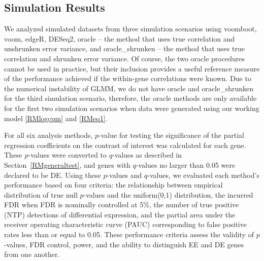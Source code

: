\subsection{Simulation Results}
We analyzed simulated datasets from  three simulation scenarios using  voomboot, voom, edgeR, DESeq2, oracle -- the method that uses true correlation   and unshrunken error variance, and oracle\_shrunken -- the method that uses true correlation  and shrunken error variance. Of course, the two oracle procedures cannot be used in practice, but their inclusion provides a useful reference measure of the performance achieved if the within-gene correlations were known. Due to the numerical instability of GLMM, we do not have oracle and oracle\_shrunken  for the third simulation scenario, therefore, the oracle methods are only available for the first two simulation scenarios when data were generated using our  working model  \eqref{RMlogcpm} and \eqref{RMeq1}.

For all six analysis methods, $p$-value for testing the significance of the partial regression coefficients on the contrast of interest was calculated for each gene. These $p$-values were converted to $q$-values as described in Section~\ref{RMgeneraltest}, and genes with $q$-values no larger than 0.05 were declared to be DE. Using these $p$-values and $q$-values, we evaluated each method's performance based on four criteria: the relationship between empirical distribution of true null $p$-values and the uniform(0,1) distribution,  the incurred FDR when FDR is nominally controlled at 5\%, the number of true positive (NTP)  detections of differential expression, and the partial area under the receiver operating characteristic curve (PAUC) corresponding to false positive rates less than or equal to 0.05. These performance criteria assess the validity of $p$-values, FDR  control, power, and the ability to distinguish EE and DE genes from one another.

